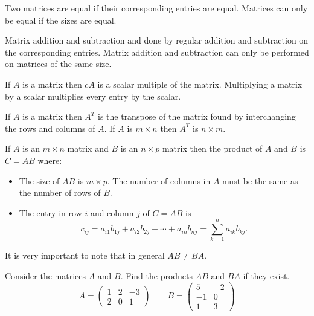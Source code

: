 \begin{definition}
    Two matrices are equal if their corresponding entries are equal. Matrices can only be
    equal if the sizes are equal.
\end{definition}

\begin{definition} 
    Matrix addition and subtraction and done by regular addition and subtraction on the
    corresponding entries. Matrix addition and subtraction can only be performed on
    matrices of the same size.
\end{definition}

\begin{definition}
    If $A$ is a matrix then $cA$ is a scalar multiple of the matrix.  Multiplying a matrix
    by a scalar multiplies every entry by the scalar.
\end{definition}

\begin{definition} 
    If $A$ is a matrix then $A^T$
    is the transpose of the matrix found by interchanging
    the rows and columns of $A$. If $A$ is $m \times n$ then $A^T$
    is $n \times m$.
\end{definition}
    
\begin{definition}
    If $A$ is an $m \times n$ matrix and $B$ is an $n \times p$ matrix then the product of
    $A$ and $B$ is $C = AB$ where:
    \begin{itemize}
        \item The size of $AB$ is $m \times p$.  The number of columns in $A$ must be the
            same as the number of rows of $B$.
        \item The entry in row $i$ and column $j$ of $C = AB$ is
            \[ c_{ij} = a_{i1} b_{1j} + a_{i2}b_{2j} + \cdots + a_{in}b_{nj} =
            \sum_{k=1}^n a_{ik}b_{kj}.\]
    \end{itemize}
    It is very important to note that in general $AB \ne BA$.
\end{definition}

\begin{problem}
    Consider the matrices $A$ and $B$.  Find the products $AB$ and $BA$ if they exist.
    \[ A = \begin{pmatrix} 1 & 2 & -3 \\ 2 & 0 & 1 \end{pmatrix} \qquad B =
    \begin{pmatrix} 5 & -2 \\ -1 & 0 \\ 1 & 3 \end{pmatrix} \]
\end{problem}
\solution{
    \[ AB = \begin{pmatrix} 0 & -11 \\ 11 & -1 \end{pmatrix} \qquad BA = \begin{pmatrix} 1
        & 10 & -17 \\ -1 & -2 & 3 \\ 7 & 2 & 0 \end{pmatrix} \]
}


